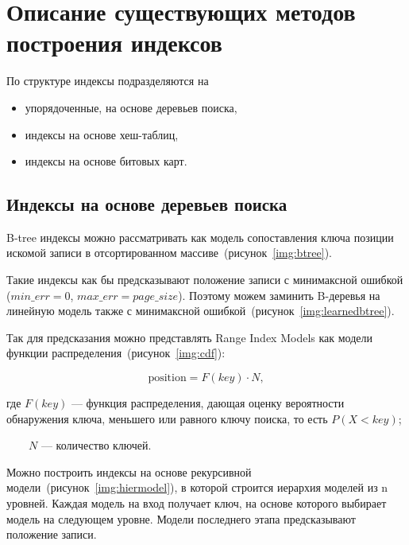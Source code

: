 \chapter{Описание существующих методов построения индексов}

По структуре индексы подразделяются на
\begin{itemize}
    \item упорядоченные, на основе деревьев поиска,
    \item индексы на основе хеш-таблиц,
    \item индексы на основе битовых карт.
\end{itemize}

\section{Индексы на основе деревьев поиска}

B-tree индексы можно рассматривать как модель сопоставления ключа позиции
искомой записи в отсортированном массиве~(рисунок~\ref{img:btree}).


Такие индексы как бы предсказывают положение записи с минимаксной ошибкой
($min\_err = 0$, $max\_err = page\_size$). Поэтому можем заминить B-деревья на
линейную модель также с минимаксной ошибкой~(рисунок~\ref{img:learnedbtree}).


Так для предсказания можно представлять Range Index Models как модели функции
распределения~(рисунок~\ref{img:cdf}):

\begin{equation}
    \text{position} = F(key) \cdot N,
\end{equation}

где $F(key)$ --- функция распределения, дающая оценку вероятности обнаружения
ключа, меньшего или равного ключу поиска, то есть $P(X < key)$;

~~~~$N$ --- количество ключей.


Можно построить индексы на основе рекурсивной
модели~(рисунок~\ref{img:hiermodel}), в которой строится иерархия моделей из n
уровней. Каждая модель на вход получает ключ, на основе которого выбирает модель
на следующем уровне. Модели последнего этапа предсказывают положение записи.


